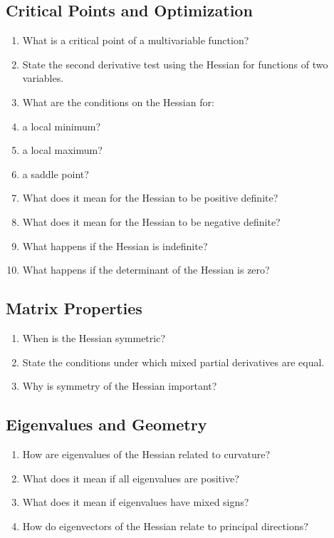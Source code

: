 \subsection{Critical Points and Optimization}
\begin{enumerate}
\item What is a critical point of a multivariable function?
\item State the second derivative test using the Hessian for functions of two variables.
\item What are the conditions on the Hessian for:
\item a local minimum?
\item a local maximum?
\item a saddle point?
\item What does it mean for the Hessian to be positive definite?
\item What does it mean for the Hessian to be negative definite?
\item What happens if the Hessian is indefinite?
\item What happens if the determinant of the Hessian is zero?
\end{enumerate}

\subsection{Matrix Properties}
\begin{enumerate}
\item When is the Hessian symmetric?
\item State the conditions under which mixed partial derivatives are equal.
\item Why is symmetry of the Hessian important?
\end{enumerate}

\subsection{Eigenvalues and Geometry}
\begin{enumerate}
\item How are eigenvalues of the Hessian related to curvature?
\item What does it mean if all eigenvalues are positive?
\item What does it mean if eigenvalues have mixed signs?
\item How do eigenvectors of the Hessian relate to principal directions?
\end{enumerate}

